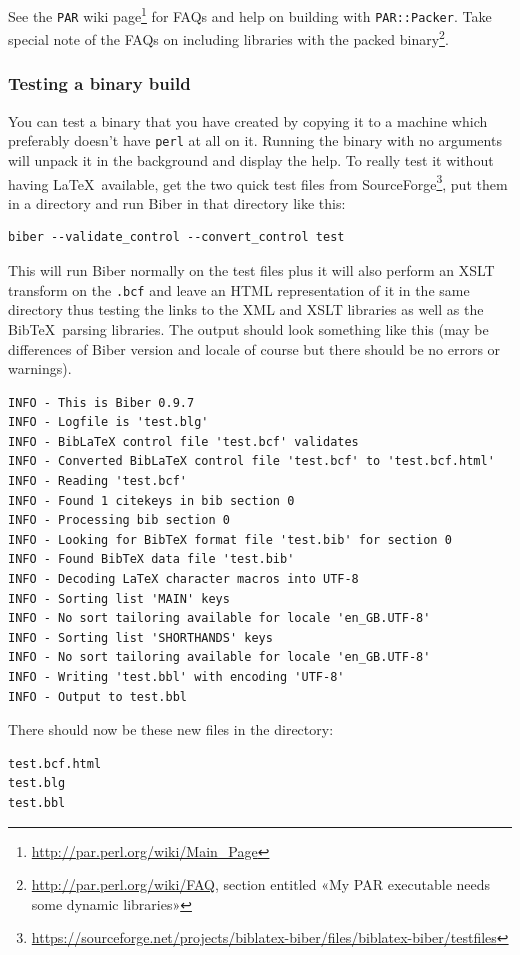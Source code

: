 \documentclass{ltxdockit}
\begin{document}
See the \verb+PAR+ wiki
page\footnote{\url{http://par.perl.org/wiki/Main_Page}} for FAQs and help
on building with \verb+PAR::Packer+. Take special note of the FAQs on
including libraries with the packed
binary\footnote{\url{http://par.perl.org/wiki/FAQ}, section entitled «My
  PAR executable needs some dynamic libraries»}.

\subsubsection{Testing a binary build}
You can test a binary that you have created by copying it to a machine
which preferably doesn't have \verb+perl+ at all on it. Running the binary with no
arguments will unpack it in the background and display the help. To really
test it without having \LaTeX\ available, get the two quick test files from
SourceForge\footnote{\url{https://sourceforge.net/projects/biblatex-biber/files/biblatex-biber/testfiles}},
put them in a directory and run Biber in that directory like this:

\begin{verbatim}
biber --validate_control --convert_control test
\end{verbatim}

\noindent This will run Biber normally on the test files plus it
will also perform an XSLT transform on the \verb+.bcf+ and
leave an HTML representation of it in the same directory thus testing the
links to the XML and XSLT libraries as well as the Bib\TeX\ parsing
libraries. The output should look something like this (may be differences
of Biber version and locale of course but there should be no errors
or warnings).

\begin{verbatim}
INFO - This is Biber 0.9.7
INFO - Logfile is 'test.blg'
INFO - BibLaTeX control file 'test.bcf' validates
INFO - Converted BibLaTeX control file 'test.bcf' to 'test.bcf.html'
INFO - Reading 'test.bcf'
INFO - Found 1 citekeys in bib section 0
INFO - Processing bib section 0
INFO - Looking for BibTeX format file 'test.bib' for section 0
INFO - Found BibTeX data file 'test.bib'
INFO - Decoding LaTeX character macros into UTF-8
INFO - Sorting list 'MAIN' keys
INFO - No sort tailoring available for locale 'en_GB.UTF-8'
INFO - Sorting list 'SHORTHANDS' keys
INFO - No sort tailoring available for locale 'en_GB.UTF-8'
INFO - Writing 'test.bbl' with encoding 'UTF-8'
INFO - Output to test.bbl
\end{verbatim}

\noindent There should now be these new files in the directory:

\begin{verbatim}
test.bcf.html
test.blg
test.bbl
\end{verbatim}
\end{document}
